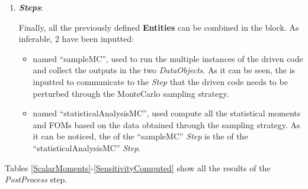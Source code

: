 \begin{enumerate}
   \item \textbf{\textit{Steps}}:

   Finally, all the previously defined \textbf{Entities} can be combined in
   the  block. As inferable,
   2  have been inputted:
   \begin{itemize}
     \item {} named ``sampleMC'', used to run the
     multiple
     instances of the driven code and
     collect the outputs in the two \textit{DataObjects}. As it can be
     seen, the  is inputted to communicate to the
     \textit{Step} that the driven code needs to
     be perturbed through the MonteCarlo sampling strategy.
     \item {} named ``statisticalAnalysisMC'', used
     compute all the statistical moments and FOMs based on the
     data obtained through the sampling strategy. As it can be noticed,
     the  of the ``sampleMC'' \textit{Step} is the
      of the ``statisticalAnalysisMC''  \textit{Step}.
   \end{itemize}
\end{enumerate}

Tables \ref{ScalarMoments}-\ref{SensitivityComputed} show all the results of the \textit{PostProcess}
step.


